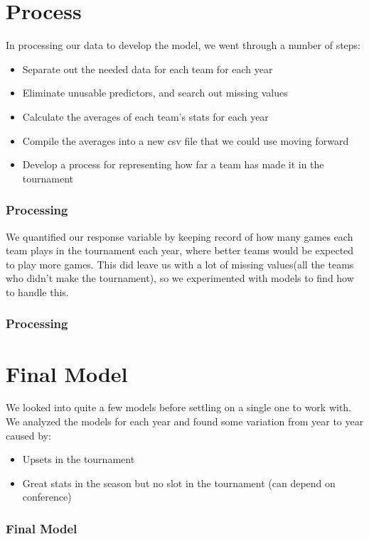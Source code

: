 \documentclass[11pt]{beamer}
\begin{document}
\section{Process}
\begin{frame}
In processing our data to develop the model, we went through a number of steps:
\begin{itemize}
	\footnotesize
	\item Separate out the needed data for each team for each year
	\item Eliminate unusable predictors, and search out missing values
	\item Calculate the averages of each team's stats for each year
	\item Compile the averages into a new csv file that we could use moving forward
	\item Develop a process for representing how far a team has made it in the tournament
\end{itemize}
\frametitle{{\textbf{\huge Processing}}}
\end{frame}
\begin{frame}
\center We quantified our response variable by keeping record of how many games each team plays in the tournament each year, where better teams would be expected to play more games. This did leave us with a lot of missing values(all the teams who didn't make the tournament), so we experimented with models to find how to handle this.
\frametitle{{\textbf{\huge Processing}}}
\end{frame}
\section{Final Model}
\begin{frame}
We looked into quite a few models before settling on a single one to work with. We analyzed the models for each year and found some variation from year to year caused by:
\footnotesize
\begin{itemize}
	\item Upsets in the tournament
	\item Great stats in the season but no slot in the tournament (can depend on conference)
\end{itemize}
\frametitle{{\textbf{\huge Final Model}}}
\end{frame}
\end{document}
